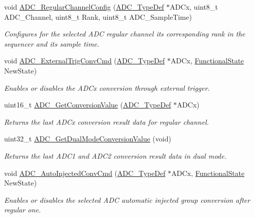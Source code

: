 \begin{DoxyCompactItemize}
void \hyperlink{group___a_d_c___exported___functions_gac531adb577b648d4bb8881f2ed627d52}{A\+D\+C\+\_\+\+Regular\+Channel\+Config} (\hyperlink{struct_a_d_c___type_def}{A\+D\+C\+\_\+\+Type\+Def} $\ast$A\+D\+Cx, uint8\+\_\+t A\+D\+C\+\_\+\+Channel, uint8\+\_\+t Rank, uint8\+\_\+t A\+D\+C\+\_\+\+Sample\+Time)
\begin{DoxyCompactList}\small\item\em Configures for the selected A\+DC regular channel its corresponding rank in the sequencer and its sample time. \end{DoxyCompactList}\item 
void \hyperlink{group___a_d_c___exported___functions_ga3ae92d7940a16c898223374a5857f509}{A\+D\+C\+\_\+\+External\+Trig\+Conv\+Cmd} (\hyperlink{struct_a_d_c___type_def}{A\+D\+C\+\_\+\+Type\+Def} $\ast$A\+D\+Cx, \hyperlink{group___exported__types_gac9a7e9a35d2513ec15c3b537aaa4fba1}{Functional\+State} New\+State)
\begin{DoxyCompactList}\small\item\em Enables or disables the A\+D\+Cx conversion through external trigger. \end{DoxyCompactList}\item 
uint16\+\_\+t \hyperlink{group___a_d_c___exported___functions_gaaf74221c285ec5dab5e66baf7bec6bd3}{A\+D\+C\+\_\+\+Get\+Conversion\+Value} (\hyperlink{struct_a_d_c___type_def}{A\+D\+C\+\_\+\+Type\+Def} $\ast$A\+D\+Cx)
\begin{DoxyCompactList}\small\item\em Returns the last A\+D\+Cx conversion result data for regular channel. \end{DoxyCompactList}\item 
uint32\+\_\+t \hyperlink{group___a_d_c___exported___functions_gac5a4792dc29ef7ff6bfbce9f37e8a668}{A\+D\+C\+\_\+\+Get\+Dual\+Mode\+Conversion\+Value} (void)
\begin{DoxyCompactList}\small\item\em Returns the last A\+D\+C1 and A\+D\+C2 conversion result data in dual mode. \end{DoxyCompactList}\item 
void \hyperlink{group___a_d_c___exported___functions_ga1ff9c3b8e4bbdd2addfd227f1a506a66}{A\+D\+C\+\_\+\+Auto\+Injected\+Conv\+Cmd} (\hyperlink{struct_a_d_c___type_def}{A\+D\+C\+\_\+\+Type\+Def} $\ast$A\+D\+Cx, \hyperlink{group___exported__types_gac9a7e9a35d2513ec15c3b537aaa4fba1}{Functional\+State} New\+State)
\begin{DoxyCompactList}\small\item\em Enables or disables the selected A\+DC automatic injected group conversion after regular one. \end{DoxyCompactList}\item 

\end{DoxyCompactItemize}
